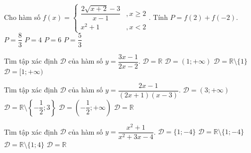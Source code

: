 \begin{ex}%
	Cho hàm số $f(x)=\left\{\begin{array}{*{35}{l}}
	\dfrac{2\sqrt{x+2}-3}{x-1} &, x\ge 2 \\
	x^2 +1 &, x<2
	\end{array}\right.$. Tính $P=f(2)+f(-2)$.
	\choice
	{$P=\dfrac{8}{3}$}
	{$P=4$}
	{\True $P=6$}
	{$P=\dfrac{5}{3}$}
\end{ex}
\begin{ex}%
	Tìm tập xác định $\mathscr{D}$ của hàm số $y=\dfrac{3x-1}{2x-2}$.
	\choice
	{$\mathscr{D}=\mathbb{R}$}
	{$\mathscr{D}=(1;+\infty)$}
	{\True $\mathscr{D}=\mathbb{R}\setminus\{1\}$}
	{$\mathscr{D}=[1;+\infty)$}
\end{ex}
\begin{ex}%
	Tìm tập xác định $\mathscr{D}$ của hàm số $y=\dfrac{2x-1}{(2x+1)(x-3)}$.
	\choice
	{$\mathscr{D}=(3;+\infty)$}
	{\True $\mathscr{D}=\mathbb{R}\setminus\left\{-\dfrac{1}{2};3\right\}$}
	{$\mathscr{D}=\left(-\dfrac{1}{2};+\infty\right)$}
	{$\mathscr{D}=\mathbb{R}$}
\end{ex}
\begin{ex}%
	Tìm tập xác định $\mathscr{D}$ của hàm số $y=\dfrac{x^2+1}{x^2+3x-4}$.
	\choice
	{$\mathscr{D}=\{1;-4\}$}
	{\True $\mathscr{D}=\mathbb{R}\setminus\{1;-4\}$}
	{$\mathscr{D}=\mathbb{R}\setminus\{1;4\}$}
	{$\mathscr{D}=\mathbb{R}$}
\end{ex}

